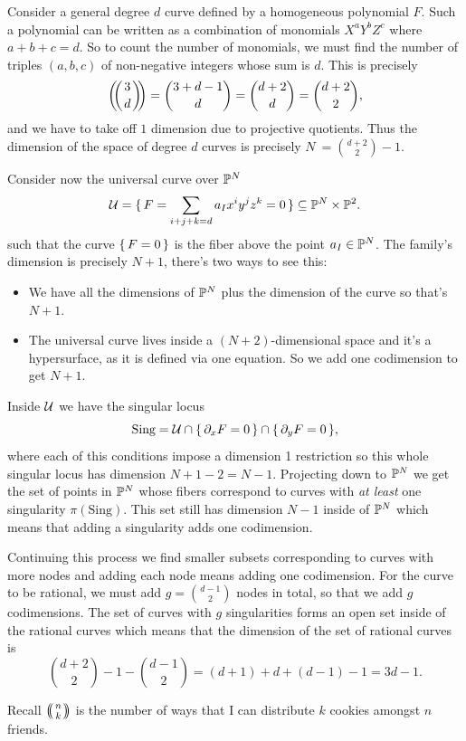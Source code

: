 \documentclass[12pt]{memoir}
\begin{document}
\begin{ptcbp}
    Consider a general degree $d$ curve defined by a homogeneous polynomial $F$. Such a polynomial can be written as a combination of monomials $X^{a}Y^{b}Z^{c}$ where $a+b+c=d$. So to count the number of monomials, we must find the number of triples $(a,b,c)$ of non-negative integers whose sum is $d$. This is precisely 
    $$\multinom{3}{d}=\binom{3+d-1}{d}=\binom{d+2}{d}=\binom{d+2}{2},$$
    and we have to take off $1$ dimension due to projective quotients. Thus the dimension of the space of degree $d$ curves is precisely $N\:=\binom{d+2}{2}-1$.\par 
    Consider now the universal curve over $\mathbb{P}^N$
    $$\mathcal{U}=\{\,F=\sum_{i+j+k=d}a_Ix^iy^jz^k=0\,\}\subseteq\mathbb{P}^N\times\mathbb{P}^2.$$
    such that the curve $\{\,F=0\,\}$ is the fiber above the point $a_I\in\mathbb{P}^N$. The family's dimension is precisely $N+1$, there's two ways to see this:
    \begin{itemize}
        \item We have all the dimensions of $\mathbb{P}^N$ plus the dimension of the curve so that's $N+1$.
        \item The universal curve lives inside a $(N+2)$-dimensional space and it's a hypersurface, as it is defined via one equation. So we add one codimension to get $N+1$.
    \end{itemize}
    Inside $\mathcal{U}$ we have the singular locus
    $$\text{Sing}=\mathcal{U}\cap\{\,\partial_xF=0\,\}\cap\{\,\partial_yF=0\,\},$$
    where each of this conditions impose a dimension 1 restriction so this whole singular locus has dimension $N+1-2=N-1$. Projecting down to $\mathbb{P}^N$ we get the set of points in $\mathbb{P}^N$ whose fibers correspond to curves with \emph{at least} one singularity $\pi(\text{Sing})$. This set still has dimension $N-1$ inside of $\mathbb{P}^N$ which means that adding a singularity adds one codimension.\par 
    Continuing this process we find smaller subsets corresponding to curves with more nodes and adding each node means adding one codimension. For the curve to be rational, we must add $g=\binom{d-1}{2}$ nodes in total, so that we add $g$ codimensions. The set of curves with $g$ singularities forms an open set inside of the rational curves which means that the dimension of the set of rational curves is
    $$\binom{d+2}{2}-1-\binom{d-1}{2}=(d+1)+d+(d-1)-1=3d-1.$$
\end{ptcbp}

\begin{Rmk}
    Recall $\multinom{n}{k}$ is the number of ways that I can distribute $k$ cookies amongst $n$ friends.
\end{Rmk}
\end{document}
